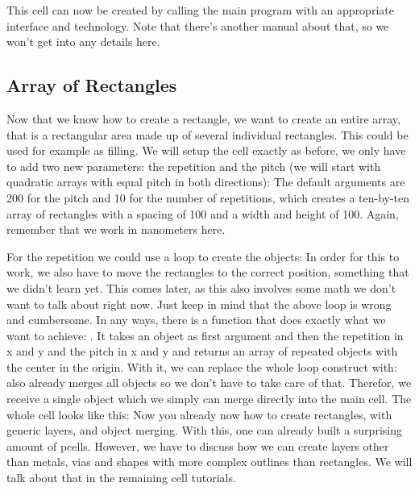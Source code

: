 This cell can now be created by calling the main program with an appropriate interface and technology. Note that there's another manual about that, so we won't get
into any details here.

\subsection{Array of Rectangles}
Now that we know how to create a rectangle, we want to create an entire array, that is a rectangular area made up of several individual rectangles. This could be
used for example as filling. We will setup the cell exactly as before, we only have to add two new parameters: the repetition and the pitch (we will start with
quadratic arrays with equal pitch in both directions):
The default arguments are \num{200} for the pitch and \num{10} for the number of repetitions, which creates a ten-by-ten array of rectangles with a spacing of
\num{100} and a width and height of \num{100}. Again, remember that we work in nanometers here.

For the repetition we could use a loop to create the objects:
In order for this to work, we also have to move the rectangles to the correct position, something that we didn't learn yet. This comes later, as this also involves
some math we don't want to talk about right now. Just keep in mind that the above loop is wrong and cumbersome. In any ways, there is a function that does
exactly what we want to achieve:
. It takes an object as first argument and then the repetition in x and y and the pitch in x and y and returns an array of repeated
objects with the center in the origin. With it, we can replace the whole loop construct with:
 also already merges all objects so we don't have to take care of that. Therefor, we receive a single object which we simply can
merge directly into the main cell. The whole cell looks like this:
Now you already now how to create rectangles, with generic layers,  and object merging. With this, one can already built a
surprising amount of pcells. However, we have to discuss how we can create layers other than metals, vias and shapes with more complex outlines than rectangles. We
will talk about that in the remaining cell tutorials.

